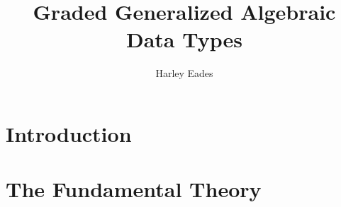 \documentclass[12pt]{article}
\title{Graded Generalized Algebraic Data Types}
\author{Harley Eades}
\begin{document}
\maketitle

\begin{abstract}
  
\end{abstract}

\section{Introduction}
\label{sec:introduction}


\section{The Fundamental Theory}


\nocite{*}


\appendix
\end{document}
